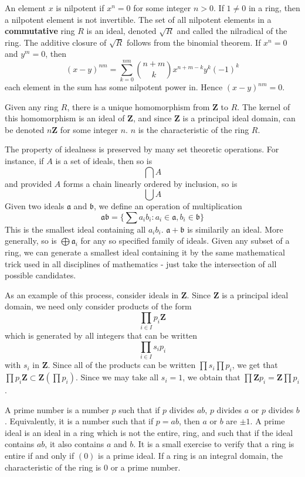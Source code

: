 An element $x$ is nilpotent if $x^n = 0$ for some integer $n > 0$. If $1 \neq 0$ in a ring, then a nilpotent element is not invertible. The set of all nilpotent elements in a {\bf commutative} ring $R$ is an ideal, denoted $\sqrt{R}$ and called the nilradical of the ring. The additive closure of $\sqrt{R}$ follows from the binomial theorem. If $x^n = 0$ and $y^m = 0$, then
%
\[ (x - y)^{nm} = \sum_{k = 0}^{nm} \binom{n + m}{k} x^{n + m - k}y^k (-1)^k \]
%
each element in the sum has some nilpotent power in. Hence $(x - y)^{nm} = 0$.

Given any ring $R$, there is a unique homomorphism from $\mathbf{Z}$ to $R$. The kernel of this homomorphism is an ideal of $\mathbf{Z}$, and since $\mathbf{Z}$ is a principal ideal domain, can be denoted $n\mathbf{Z}$ for some integer $n$. $n$ is the characteristic of the ring $R$.

The property of idealness is preserved by many set theoretic operations. For instance, if $A$ is a set of ideals, then so is
%
\[ \bigcap A \]
%
and provided $A$ forms a chain linearly ordered by inclusion, so is
%
\[ \bigcup A \]
%
Given two ideals $\mathfrak{a}$ and $\mathfrak{b}$, we define an operation of multiplication
%
\[ \mathfrak{a} \mathfrak{b} = \{ \sum a_i b_i : a_i \in \mathfrak{a}, b_i \in \mathfrak{b} \} \]
%
This is the smallest ideal containing all $a_i b_i$. $\mathfrak{a} + \mathfrak{b}$ is similarily an ideal. More generally, so is $\bigoplus \mathfrak{a}_i$ for any so specified family of ideals. Given any subset of a ring, we can generate a smallest ideal containing it by the same mathematical trick used in all disciplines of mathematics - just take the intersection of all possible candidates.

As an example of this process, consider ideals in $\mathbf{Z}$. Since $\mathbf{Z}$ is a principal ideal domain, we need only consider products of the form
%
\[ \prod_{i \in I} p_i \mathbf{Z} \]
%
which is generated by all integers that can be written
%
\[ \prod_{i \in I} s_i p_i \]
%
with $s_i$ in $\mathbf{Z}$. Since all of the products can be written $\prod s_i \prod p_i$, we get that $\prod p_i \mathbf{Z} \subset \mathbf{Z}(\prod p_i)$. Since we may take all $s_i = 1$, we obtain that $\prod \mathbf{Z} p_i = \mathbf{Z} \prod p_i$.

A prime number is a number $p$ such that if $p$ divides $ab$, $p$ divides $a$ or $p$ divides $b$. Equivalently, it is a number such that if $p = ab$, then $a$ or $b$ are $\pm 1$. A prime ideal is an ideal in a ring which is not the entire, ring, and such that if the ideal contains $ab$, it also contains $a$ and $b$. It is a small exercise to verify that a ring is entire if and only if $(0)$ is a prime ideal. If a ring is an integral domain, the characteristic of the ring is $0$ or a prime number.

